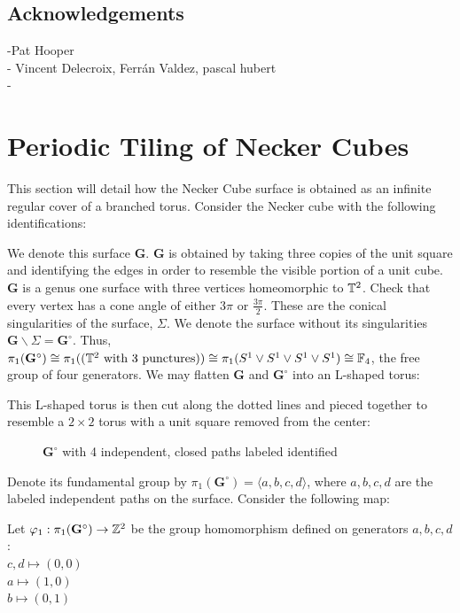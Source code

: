 \documentclass[]{article}
\def\bG{\mathbf{G}} \def\bGs{\mathbf{G}^\circ}
\def\<{\langle} \def\>{\rangle}
\begin{document}
\subsection{Acknowledgements}
-Pat Hooper\\
- Vincent Delecroix, Ferrán Valdez, pascal hubert\\
- \\

\newpage

\section{Periodic Tiling of Necker Cubes}
This section will detail how the Necker Cube surface is obtained as an infinite regular cover of a branched torus. Consider the Necker cube with the following identifications:
\begin{figure}[H]
\centering

\end{figure}

We denote this surface $\bG$. $\bG$ is obtained by taking three copies of the unit square and identifying the edges in order to resemble the visible portion of a unit cube. $\bG$ is a genus one surface with three vertices homeomorphic to $\mathbb{T}^2$. Check that every vertex has a cone angle of either $3\pi$ or $\frac{3\pi}{2}$. These are the conical singularities of the surface, $\Sigma$. We denote the surface without its singularities $\bG\backslash\Sigma = \bGs$. Thus, $\pi_1(\bGs)\cong\pi_1((\TT^2 \text{ with 3 punctures}))\cong\pi_1(S^1\vee S^1\vee S^1\vee S^1)\cong\FF_4$, the free group of four generators. We may flatten $\bG$ and $\bGs$ into an L-shaped torus: \\
\begin{figure}[H]
\centering

\end{figure}
\noindent This L-shaped torus is then cut along the dotted lines and pieced together to resemble a $2\times2$ torus with a unit square removed from the center:\\
\begin{figure}[H]
\centering

\caption{$\bGs$ with 4 independent, closed paths labeled identified}
\end{figure}
Denote its fundamental group by $\pi_1(\bGs)=\<a,b,c,d\>$, where $a,b,c,d$ are the labeled independent paths on the surface. Consider the following map:


\begin{Def}
Let $\varphi_1:\pi_1(\bGs)\rightarrow \ZZ^2$ be the group homomorphism defined on generators $a,b,c,d$: \\$c,d\mapsto(0,0)$\\ $a\mapsto(1,0)$\\$b\mapsto(0,1)$
\end{Def}
\end{document}
